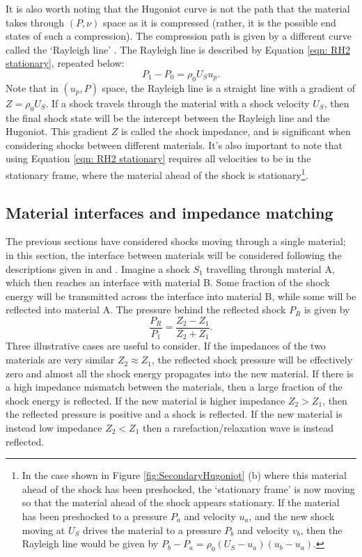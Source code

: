 It is also worth noting that the Hugoniot curve is not the path that the material takes through $(P, \nu)$ space as it is compressed (rather, it is the possible end states of such a compression). The compression path is given by a different curve called the `Rayleigh line' \cite{Forbes2012}. The Rayleigh line is described by Equation \ref{eqn: RH2 stationary}, repeated below:
\begin{equation} P_1 - P_0 = \rho_0 U_S u_p.  \end{equation}
Note that in $(u_p, P)$ space, the Rayleigh line is a straight line with a gradient of $Z = \rho_0 U_S$. If a shock travels through the material with a shock velocity $U_S$, then the final shock state will be the intercept between the Rayleigh line and the Hugoniot. This gradient $Z$ is called the shock impedance, and is significant when considering shocks between different materials. It's also important to note that using Equation \ref{eqn: RH2 stationary} requires all velocities to be in the stationary frame, where the material ahead of the shock is stationary\footnote{In the case shown in Figure \ref{fig:SecondaryHugoniot} (b) where this material ahead of the shock has been preshocked, the `stationary frame' is now moving so that the material ahead of the shock appears stationary. If the material has been preshocked to a pressure $P_a$ and velocity $u_a$, and the new shock moving at $U_S$ drives the material to a pressure $P_b$ and velocity $v_b$, then the Rayleigh line would be given by $P_b - P_a = \rho_0 (U_S - u_a) (u_b - u_a).$ }.

\subsection{Material interfaces and impedance matching \label{IMTheory}}

The previous sections have considered shocks moving through a single material; in this section, the interface between materials will be considered following the descriptions given in \cite{Forbes2012} and \cite{Davison2008}. Imagine a shock $S_1$ travelling through material A, which then reaches an interface with material B. Some fraction of the shock energy will be transmitted across the interface into material B, while some will be reflected into material A. The pressure behind the reflected shock $P_R$ is given \cite{Colvin2013} by 
\begin{equation} \frac{P_R}{P_1} = \frac{Z_2 - Z_1}{Z_2 + Z_1}.  \end{equation}
Three illustrative cases are useful to consider. If the impedances of the two materials are very similar $Z_2 \approx Z_1$, the reflected shock pressure will be effectively zero and almost all the shock energy propagates into the new material. If there is a high impedance mismatch between the materials, then a large fraction of the shock energy is reflected. If the new material is higher impedance $Z_2 > Z_1$, then the reflected pressure is positive and a shock is reflected. If the new material is instead low impedance $Z_2 < Z_1$ then a rarefaction/relaxation wave is instead reflected.

